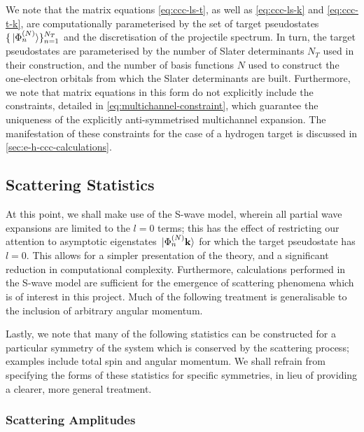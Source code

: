 \documentclass[draft]{article}
\begin{document}
We note that the matrix equations \autoref{eq:ccc-ls-t}, as well as
\autoref{eq:ccc-ls-k} and \autoref{eq:ccc-t-k}, are computationally
parameterised by the set of target pseudostates
$\lbrace\ket*{\Phi_{n}^{(N)}}\rbrace_{n = 1}^{N_{T}}$ and the discretisation of
the projectile spectrum.
In turn, the target pseudostates are parameterised by the number of Slater
determinants $N_{T}$ used in their construction, and the number of basis
functions $N$ used to construct the one-electron orbitals from which the Slater
determinants are built.
Furthermore, we note that matrix equations in this form do not explicitly
include the constraints, detailed in \autoref{eq:multichannel-constraint}, which
guarantee the uniqueness of the explicitly anti-symmetrised multichannel
expansion.
The manifestation of these constraints for the case of a hydrogen target is
discussed in \autoref{sec:e-h-ccc-calculations}.

\subsection{Scattering Statistics}
\label{sec:scattering-statistics}

At this point, we shall make use of the S-wave model, wherein all partial wave
expansions are limited to the $l = 0$ terms; this has the effect of restricting
our attention to asymptotic eigenstates $\ket*{\Phi_{n}^{(N)} \vb{k}}$ for
which the target pseudostate has $l = 0$.
This allows for a simpler presentation of the theory, and a significant
reduction in computational complexity.
Furthermore, calculations performed in the S-wave model are sufficient for the
emergence of scattering phenomena which is of interest in this project.
Much of the following treatment is generalisable to the inclusion of arbitrary
angular momentum.

Lastly, we note that many of the following statistics can be constructed for a
particular symmetry of the system which is conserved by the scattering process;
examples include total spin and angular momentum.
We shall refrain from specifying the forms of these statistics for specific
symmetries, in lieu of providing a clearer, more general treatment.

\subsubsection{Scattering Amplitudes}
\label{sec:scattering-amplitudes}
\end{document}
